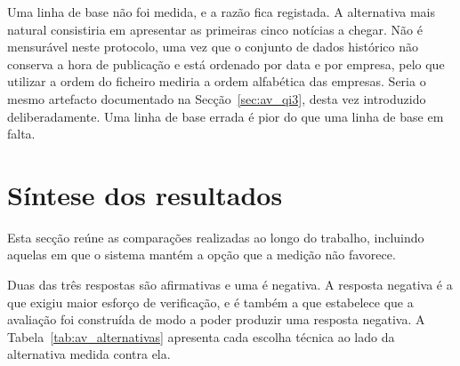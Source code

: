 Uma linha de base não foi medida, e a razão fica registada. A alternativa mais natural consistiria em
apresentar as primeiras cinco notícias a chegar. Não é mensurável neste protocolo, uma vez que o
conjunto de dados histórico não conserva a hora de publicação e está ordenado por data e por empresa,
pelo que utilizar a ordem do ficheiro mediria a ordem alfabética das empresas. Seria o mesmo
artefacto documentado na Secção~\ref{sec:av_qi3}, desta vez introduzido deliberadamente. Uma linha de
base errada é pior do que uma linha de base em falta.



\section{Síntese dos resultados}
\label{sec:av_sintese}

Esta secção reúne as comparações realizadas ao longo do trabalho, incluindo aquelas em que o sistema
mantém a opção que a medição não favorece.

Duas das três respostas são afirmativas e uma é negativa. A resposta negativa é a que exigiu maior
esforço de verificação, e é também a que estabelece que a avaliação foi construída de modo a poder
produzir uma resposta negativa. A Tabela~\ref{tab:av_alternativas} apresenta cada escolha técnica ao
lado da alternativa medida contra ela.

